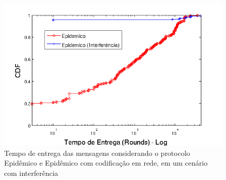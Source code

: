 \begin{figure}[ht]
\centering
\includegraphics[width=.7\textwidth]{img/tempo_epidemico_interferencia.png}
\caption{Tempo de entrega das mensagens considerando o protocolo
Epidêmico e Epidêmico com codificação em rede, em um cenário com
interferência}
\label{fig:Epidemico_EpidemicoNetCode_interf}
\end{figure}

